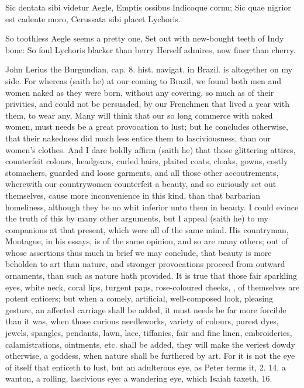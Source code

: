 Sic dentata sibi videtur Aegle,
Emptis ossibus Indicoque cornu;
Sic quae nigrior est cadente moro,
Cerussata sibi placet Lychoris.

So toothless Aegle seems a pretty one,
Set out with new-bought teeth of Indy bone:
So foul Lychoris blacker than berry
Herself admires, now finer than cherry.

John Lerius the Burgundian, cap. 8. hist. navigat. in Brazil. is
altogether on my side. For whereas (saith he) at our coming to Brazil,
we found both men and women naked as they were born, without any
covering, so much as of their privities, and could not be persuaded, by
our Frenchmen that lived a year with them, to wear any, Many will
think that our so long commerce with naked women, must needs be a great
provocation to lust; but he concludes otherwise, that their nakedness
did much less entice them to lasciviousness, than our women's clothes.
And I dare boldly affirm (saith he) that those glittering attires,
counterfeit colours, headgears, curled hairs, plaited coats, cloaks,
gowns, costly stomachers, guarded and loose garments, and all those
other accoutrements, wherewith our countrywomen counterfeit a beauty,
and so curiously set out themselves, cause more inconvenience in this
kind, than that barbarian homeliness, although they be no whit inferior
unto them in beauty. I could evince the truth of this by many other
arguments, but I appeal (saith he) to my companions at that present,
which were all of the same mind. His countryman, Montague, in his
essays, is of the same opinion, and so are many others; out of whose
assertions thus much in brief we may conclude, that beauty is more
beholden to art than nature, and stronger provocations proceed from
outward ornaments, than such as nature hath provided. It is true that
those fair sparkling eyes, white neck, coral lips, turgent paps,
rose-coloured cheeks, \etc{}, of themselves are potent enticers; but when
a comely, artificial, well-composed look, pleasing gesture, an affected
carriage shall be added, it must needs be far more forcible than it
was, when those curious needleworks, variety of colours, purest dyes,
jewels, spangles, pendants, lawn, lace, tiffanies, fair and fine linen,
embroideries, calamistrations, ointments, etc. shall be added, they
will make the veriest dowdy otherwise, a goddess, when nature shall be
furthered by art. For it is not the eye of itself that enticeth to
lust, but an adulterous eye, as Peter terms it, 2.  14. a wanton, a
rolling, lascivious eye: a wandering eye, which Isaiah taxeth,  16.
